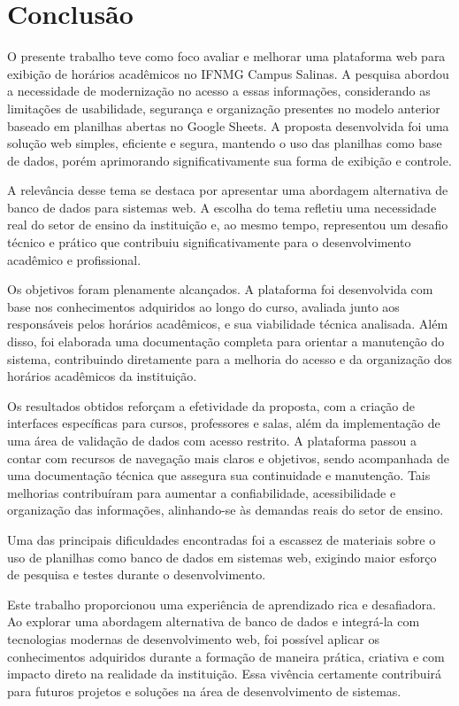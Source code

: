 \chapter{Conclusão} 
\label{cap6_conclusao} 

O presente trabalho teve como foco avaliar e melhorar uma plataforma web para exibição de horários acadêmicos no IFNMG Campus Salinas. A pesquisa abordou a necessidade de modernização no acesso a essas informações, considerando as limitações de usabilidade, segurança e organização presentes no modelo anterior baseado em planilhas abertas no Google Sheets. A proposta desenvolvida foi uma solução web simples, eficiente e segura, mantendo o uso das planilhas como base de dados, porém aprimorando significativamente sua forma de exibição e controle.

A relevância desse tema se destaca por apresentar uma abordagem alternativa de banco de dados para sistemas web. A escolha do tema refletiu uma necessidade real do setor de ensino da instituição e, ao mesmo tempo, representou um desafio técnico e prático que contribuiu significativamente para o desenvolvimento acadêmico e profissional.

Os objetivos foram plenamente alcançados. A plataforma foi desenvolvida com base nos conhecimentos adquiridos ao longo do curso, avaliada junto aos responsáveis pelos horários acadêmicos, e sua viabilidade técnica analisada. Além disso, foi elaborada uma documentação completa para orientar a manutenção do sistema, contribuindo diretamente para a melhoria do acesso e da organização dos horários acadêmicos da instituição.

Os resultados obtidos reforçam a efetividade da proposta, com a criação de interfaces específicas para cursos, professores e salas, além da implementação de uma área de validação de dados com acesso restrito. A plataforma passou a contar com recursos de navegação mais claros e objetivos, sendo acompanhada de uma documentação técnica que assegura sua continuidade e manutenção. Tais melhorias contribuíram para aumentar a confiabilidade, acessibilidade e organização das informações, alinhando-se às demandas reais do setor de ensino.

Uma das principais dificuldades encontradas foi a escassez de materiais sobre o uso de planilhas como banco de dados em sistemas web, exigindo maior esforço de pesquisa e testes durante o desenvolvimento.

Este trabalho proporcionou uma experiência de aprendizado rica e desafiadora. Ao explorar uma abordagem alternativa de banco de dados e integrá-la com tecnologias modernas de desenvolvimento web, foi possível aplicar os conhecimentos adquiridos durante a formação de maneira prática, criativa e com impacto direto na realidade da instituição. Essa vivência certamente contribuirá para futuros projetos e soluções na área de desenvolvimento de sistemas.

